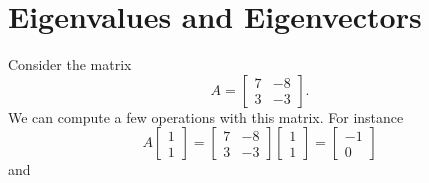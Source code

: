 \section{Eigenvalues and Eigenvectors}
\label{eig:section}


Consider the matrix \[ A = \begin{bmatrix} 7 & -8 \\ 3 & -3 \end{bmatrix}. \] We
can compute a few operations with this matrix. For instance
\[ A\begin{bmatrix} 1 \\ 1\end{bmatrix} = \begin{bmatrix} 7 & -8 \\ 3 & -3 \end{bmatrix}\begin{bmatrix} 1 \\ 1\end{bmatrix} = \begin{bmatrix} -1\\ 0 \end{bmatrix} \] and 
